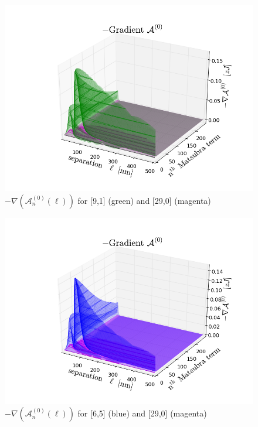 \documentclass[a4paper]{article}
\begin{document}
\begin{center}
\begin{figure}[t!]
\begin{center}
\includegraphics[width=1.2\textwidth]{plots/A0_wire2_1.png}
\hskip 43pt
\caption{$-\nabla(\mathcal{A}_{n}^{(0)}(\ell))$ for [9,1] (green) and [29,0]
(magenta)}
\label{eiz65}
\end{center}
\end{figure} 

\begin{figure}[t!]
\begin{center}
\includegraphics[width=1.2\textwidth]{plots/A0_wire2_2.png}
\hskip 43pt
\caption{$-\nabla(\mathcal{A}_{n}^{(0)}(\ell))$ for [6,5] (blue) and [29,0]
(magenta)}
\label{eiz65}
\end{center}
\end{figure} 


\end{center}
\end{document}
